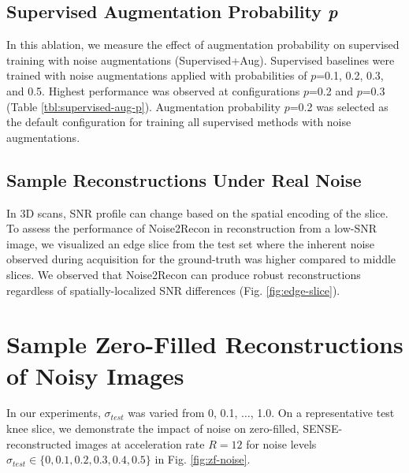 \documentclass[10pt,twocolumn,letterpaper]{article}
\newcommand{\testnoise}{\sigma_{test}}
\begin{document}


\subsection{Supervised Augmentation Probability \textit{p}}
\label{app:baseaug-noise-prob}
In this ablation, we measure the effect of augmentation probability on supervised training with noise augmentations (Supervised+Aug). Supervised baselines were trained with noise augmentations applied with probabilities of $p$=0.1, 0.2, 0.3, and 0.5. Highest performance was observed at configurations $p$=0.2 and $p$=0.3 (Table \ref{tbl:supervised-aug-p}). Augmentation probability $p$=0.2 was selected as the default configuration for training all supervised methods with noise augmentations.

\subsection{Sample Reconstructions Under Real Noise}
In 3D scans, SNR profile can change based on the spatial encoding of the slice. To assess the performance of Noise2Recon in reconstruction from a low-SNR image, we visualized an edge slice from the test set where the inherent noise observed during acquisition for the ground-truth was higher compared to middle slices. We observed that Noise2Recon can produce robust reconstructions regardless of spatially-localized SNR differences (Fig. \ref{fig:edge-slice}).


\section{Sample Zero-Filled Reconstructions of Noisy Images}
\label{app:train-noise-range}
In our experiments, $\testnoise$ was varied from 0, 0.1, $\dots$, 1.0. On a representative test knee slice, we demonstrate the impact of noise on zero-filled, SENSE-reconstructed images at acceleration rate $R = 12$ for noise levels $\testnoise \in \{0, 0.1, 0.2, 0.3, 0.4, 0.5\}$ in Fig. \ref{fig:zf-noise}.
\end{document}
